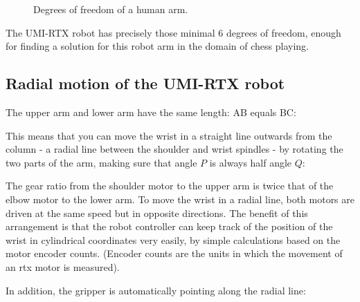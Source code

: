 \documentclass[10pt]{scrartcl}
\begin{document}
\begin{figure}[htbp] 
  \centerline{}
  \caption{Degrees of freedom of a human arm.} 
  \label{fig:hand}
\end{figure}      

The UMI-RTX robot has precisely those minimal 6 degrees of freedom,
enough for finding a solution for this robot arm in the domain of chess
playing.

\subsection{Radial motion of the UMI-RTX robot}

The upper arm and lower arm have the same length: AB equals BC: %
                                   
\begin{figure}[htp]
  \centerline{}
  \label{fig:arm1}
\end{figure}

This means that you can move the wrist in a straight line outwards from
the column - a radial line between the shoulder and wrist spindles - by
rotating the two parts of the arm, making sure that angle $P$ is always
half angle $Q$: %

\begin{figure}[htbp]
  \centerline{}
  \label{fig:arm2}
\end{figure}
                            
The gear ratio from the shoulder motor to the upper arm is twice that of
the elbow motor to the lower arm. To move the wrist in a radial line,
both motors are driven at the same speed but in opposite directions. The
benefit of this arrangement is that the robot controller can keep track
of the position of the wrist in cylindrical coordinates very easily, by
simple calculations based on the motor encoder counts. (Encoder counts
are the units in which the movement of an rtx motor is measured).

In addition, the gripper is automatically pointing along the radial
line: %

\begin{figure}[htbp]
  \centerline{}
  \label{fig:arm3}
\end{figure}
                                   
\end{document}
